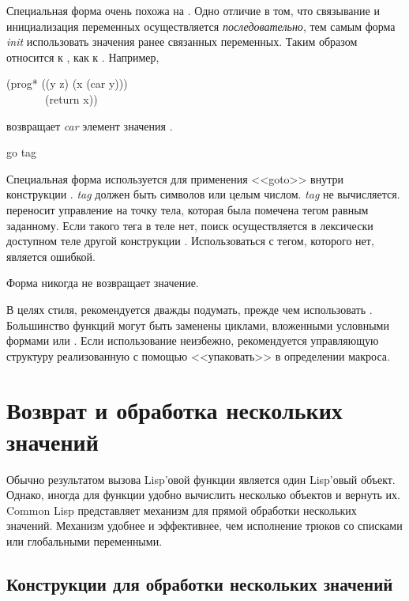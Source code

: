 \begin{defmac}
Специальная форма  очень похожа на . Одно отличие в том,
что связывание и инициализация переменных осуществляется \emph{последовательно},
тем самым форма \emph{init} использовать значения ранее связанных переменных.
Таким образом  относится к , как  к .
Например,
\begin{lisp}
(prog* ((y z) (x (car y))) \\
~~~~~~~(return x))
\end{lisp}
возвращает \emph{car} элемент значения .
\end{defmac}

\begin{defspec}
go tag

Специальная форма  используется для применения <<goto>>
внутри конструкции . \emph{tag} должен быть символов или целым
числом. \emph{tag} не вычисляется.
 переносит управление на точку тела, которая была помечена тегом равным
 заданному. Если такого тега в теле нет, поиск осуществляется в
лексически доступном теле другой конструкции .
Использоваться  с тегом, которого нет, является ошибкой.

Форма  никогда не возвращает значение.

В целях стиля, рекомендуется дважды подумать, прежде чем использовать
. Большинство функций  могут быть заменены циклами, вложенными
условными формами или . Если использование  неизбежно,
рекомендуется управляющую структуру реализованную с помощью  <<упаковать>>
в определении макроса. 
\end{defspec}

\section{Возврат и обработка нескольких значений}

Обычно результатом вызова Lisp'овой функции является один Lisp'овый объект.
Однако, иногда для функции удобно вычислить несколько объектов и вернуть их.
Common Lisp представляет механизм для прямой обработки нескольких значений.
Механизм удобнее и эффективнее, чем исполнение трюков со списками или
глобальными переменными.

\subsection{Конструкции для обработки нескольких значений}

